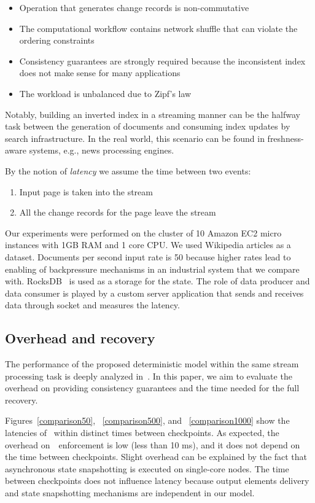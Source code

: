\begin{itemize}
    \item Operation that generates change records is non-commutative
    \item The computational workflow    contains network shuffle that can violate the ordering constraints
    \item Consistency guarantees are strongly required because the inconsistent index does not make sense for many applications
    \item The workload is unbalanced due to Zipf's law
\end{itemize}

Notably, building an inverted index in a streaming manner can be the halfway task between the generation of documents and consuming index updates by search infrastructure. In the real world, this scenario can be found in freshness-aware systems, e.g., news processing engines.

By the notion of {\it latency} we assume the time between two events: 

\begin{enumerate}
    \item Input page is taken into the stream
    \item All the change records for the page leave the stream
\end{enumerate}

Our experiments were performed on the cluster of 10 Amazon EC2 micro instances with 1GB RAM and 1 core CPU. We used Wikipedia articles as a dataset. Documents per second input rate is 50 because higher rates lead to enabling of backpressure mechanisms in an industrial system that we compare with. RocksDB~\cite{rocksdb} is used as a storage for the state. The role of data producer and data consumer is played by a custom server application that sends and receives data through socket and measures the latency.

\subsection{Overhead and recovery}
The performance of the proposed deterministic model within the same stream processing task is deeply analyzed in~\cite{we2018seim}. In this paper, we aim to evaluate the overhead on providing consistency guarantees and the time needed for the full recovery.

Figures~\ref{comparison50}, ~\ref{comparison500}, and ~\ref{comparison1000} show the latencies of \FlameStream\ within distinct times between checkpoints. As expected, the overhead on~\eo\ enforcement is low (less than 10 ms), and it does not depend on the time between checkpoints. Slight overhead can be explained by the fact that asynchronous state snapshotting is executed on single-core nodes. The time between checkpoints does not influence latency because output elements delivery and state snapshotting mechanisms are independent in our model.


